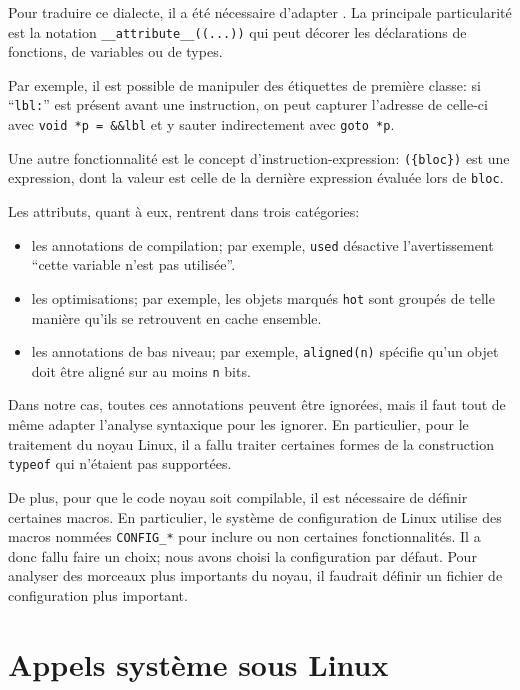 Pour traduire ce dialecte, il a été nécessaire d'adapter \ctonewspeak. La
principale particularité est la notation \verb!__attribute__((...))! qui peut
décorer les déclarations de fonctions, de variables ou de types.

Par exemple, il est possible de manipuler des étiquettes de première classe: si
\enquote{\texttt{lbl:}} est présent avant une instruction, on peut capturer
l'adresse de celle-ci avec \texttt{void *p = \&\&lbl} et y sauter indirectement
avec \texttt{goto *p}.

Une autre fonctionnalité est le concept d'instruction-expression:
\texttt{(\{bloc\})} est une expression, dont la valeur est celle de la dernière
expression évaluée lors de \texttt{bloc}.

Les attributs, quant à eux, rentrent dans trois catégories:

\begin{itemize}
  \item les annotations de compilation; par exemple, \texttt{used} désactive
  l'avertissement \enquote{cette variable n'est pas utilisée}.

  \item les optimisations; par exemple, les objets marqués \texttt{hot} sont
    groupés de telle manière qu'ils se retrouvent en cache ensemble.

  \item les annotations de bas niveau; par exemple, \verb!aligned(n)!
    spécifie qu'un objet doit être aligné sur au moins \texttt{n} bits.
\end{itemize}

Dans notre cas, toutes ces annotations peuvent être ignorées, mais il faut tout
de même adapter l'analyse syntaxique pour les ignorer. En particulier, pour le
traitement du noyau Linux, il a fallu traiter certaines formes de la
construction \texttt{typeof} qui n'étaient pas supportées.

De plus, pour que le code noyau soit compilable, il est nécessaire de définir
certaines macros. En particulier, le système de configuration de Linux utilise
des macros nommées \texttt{CONFIG\_*} pour inclure ou non certaines
fonctionnalités. Il a donc fallu faire un choix; nous avons choisi la
configuration par défaut. Pour analyser des morceaux plus importants du noyau,
il faudrait définir un fichier de configuration plus important.

\section{Appels système sous Linux}
\label{sec:linux-sys}

